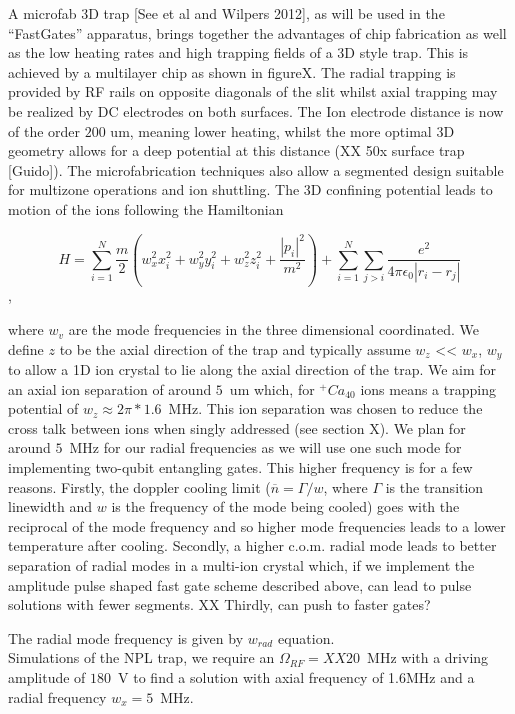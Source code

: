 \documentclass[12pt]{iopart}
\begin{document}
A microfab 3D trap [See et al and Wilpers 2012], as will be used in
the ``FastGates'' apparatus, brings together the advantages of chip
fabrication as well as the low heating rates and high trapping fields
of a 3D style trap. This is achieved by a multilayer chip as shown in
figureX. The radial trapping is provided by RF rails on opposite
diagonals of the slit whilst axial trapping may be realized by DC
electrodes on both surfaces. The Ion electrode distance is now of the
order $200$ um, meaning lower heating, whilst the more optimal 3D
geometry allows for a deep potential at this distance (XX 50x surface trap [Guido]). The
microfabrication techniques also allow a segmented design suitable for
multizone operations and ion shuttling.  The 3D confining potential
leads to motion of the ions following the Hamiltonian

$$ H = \sum_{i=1}^N \frac{m}{2}(w_x^2x_i^2 + w_y^2y_i^2 + w_z^2z_i^2 + \frac{|p_i|^2}{m^2}) + \sum_{i=1}^N\sum_{j>i}\frac{e^2}{4\pi\epsilon_0|r_i - r_j|}$$,

where $w_v$ are the mode frequencies in the three dimensional
coordinated. We define $z$ to be the axial direction of the trap and
typically assume $w_z$ << $w_x$, $w_y$ to allow a 1D ion crystal to
lie along the axial direction of the trap. We aim for an axial ion
separation of around $5$~um which, for $^+Ca_{40}$ ions means a
trapping potential of $w_z \approx 2\pi * 1.6$~MHz. This ion
separation was chosen to reduce the cross talk between ions when
singly addressed (see section X). We plan for around $5$~MHz for our
radial frequencies as we will use one such mode for implementing
two-qubit entangling gates. This higher frequency is for a few
reasons. Firstly, the doppler cooling limit
($\overline{n} = \Gamma/w$, where $\Gamma$ is the transition linewidth
and $w$ is the frequency of the mode being cooled) goes with the
reciprocal of the mode frequency and so higher mode frequencies leads
to a lower temperature after cooling. Secondly, a higher c.o.m. radial
mode leads to better separation of radial modes in a multi-ion crystal
which, if we implement the amplitude pulse shaped fast gate scheme
described above, can lead to pulse solutions with fewer segments. XX
Thirdly, can push to faster gates?

The radial mode frequency is given by
$w_{rad}$ equation. \\
Simulations of the NPL trap,
we require an $\Omega_{RF} = XX20$~MHz with a driving amplitude of
$180$~V to find a solution with axial frequency of 1.6MHz and a radial
frequency $w_x = 5$~MHz.
\end{document}

